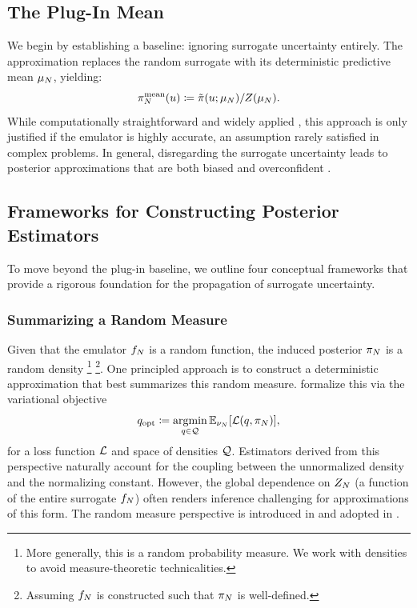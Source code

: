 \documentclass[12pt]{article}
\begin{document}
\subsection{The Plug-In Mean}
We begin by establishing a baseline: ignoring surrogate uncertainty entirely. The  
approximation replaces the random surrogate with its deterministic predictive mean $\mu_{N}$, yielding:
\begin{equation}
{\pi}_{N}^{\mathrm{mean}}(u) \coloneqq \tilde{\pi}(u; \mu_{N}) / Z(\mu_{N}).
\label{eq:mean-approx}
\end{equation}
While computationally straightforward and widely applied
\citep{VehtariParallelGP,trainDynamics,emPostDens,BurknerSurrogate,CLMBayesianCalibration,Lueckmann2018LikelihoodfreeIW,BilionisBayesSurrogates}, 
this approach is only justified if the emulator is highly accurate, an assumption rarely satisfied in complex problems. 
In general, disregarding the surrogate uncertainty leads to posterior 
approximations that are both biased and 
overconfident \citep{BurknerSurrogate,BilionisBayesSurrogates,StuartTeck1,ourSurrPropPaper}.

\subsection{Frameworks for Constructing Posterior Estimators}
To move beyond the plug-in baseline, we outline four conceptual frameworks that
provide a rigorous foundation for the propagation of surrogate uncertainty.

\subsubsection{Summarizing a Random Measure} \label{sec:random-measure}
Given that the emulator $f_{N}$ is a random function, the induced posterior ${\pi}_{N}$ is a random density
\footnote{More generally, this is a random probability measure. We work with densities to avoid measure-theoretic technicalities.}
\footnote{Assuming $f_{N}$ is constructed such that ${\pi}_{N}$ is well-defined.}. 
One principled approach is to construct a deterministic approximation that best summarizes this random measure. 
\citet{ourSurrPropPaper} formalize this via the variational objective
\begin{equation}
q_{\mathrm{opt}} \coloneqq \operatorname*{argmin}_{q \in \mathcal{Q}} \mathbb{E}_{\nu_{N}}[\mathcal{L}(q, {\pi}_{N})],
\label{eq:random-measure-variational}
\end{equation}
for a loss function $\mathcal{L}$ and space of densities $\mathcal{Q}$.
Estimators derived from this perspective naturally account for the coupling between the unnormalized density and the 
normalizing constant. However, the global dependence on ${Z}_{N}$ (a function of the 
entire surrogate $f_{N}$) often renders inference challenging for approximations of this form.
The random measure perspective is introduced in \citet{StuartTeck1} and adopted in 
\citet{ourSurrPropPaper,StuartTeck2,random_fwd_models,TeckHyperpar}.
\end{document}
